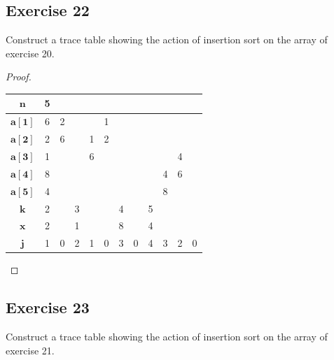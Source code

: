 \documentclass[14pt]{extarticle}
\begin{document}
\subsection{Exercise 22}
Construct a trace table showing the action of insertion sort on the array of exercise 20.

\begin{proof}
    \begin{center}
        \begin{tabular}{|c|c|c|c|c|c|c|c|c|c|c|c|}
            \hline
            \(\bm{n}\)    & 5 &   &   &   &   &   &   &   &   &   &   \\
            \hline
            \(\bm{a[1]}\) & 6 & 2 &   &   & 1 &   &   &   &   &   &   \\
            \hline
            \(\bm{a[2]}\) & 2 & 6 &   & 1 & 2 &   &   &   &   &   &   \\
            \hline
            \(\bm{a[3]}\) & 1 &   &   & 6 &   &   &   &   &   & 4 &   \\
            \hline
            \(\bm{a[4]}\) & 8 &   &   &   &   &   &   &   & 4 & 6 &   \\
            \hline
            \(\bm{a[5]}\) & 4 &   &   &   &   &   &   &   & 8 &   &   \\
            \hline
            \(\bm{k}\)    & 2 &   & 3 &   &   & 4 &   & 5 &   &   &   \\
            \hline
            \(\bm{x}\)    & 2 &   & 1 &   &   & 8 &   & 4 &   &   &   \\
            \hline
            \(\bm{j}\)    & 1 & 0 & 2 & 1 & 0 & 3 & 0 & 4 & 3 & 2 & 0 \\
            \hline
        \end{tabular}
    \end{center}
\end{proof}

\subsection{Exercise 23}
Construct a trace table showing the action of insertion sort on the array of exercise 21.
\end{document}
